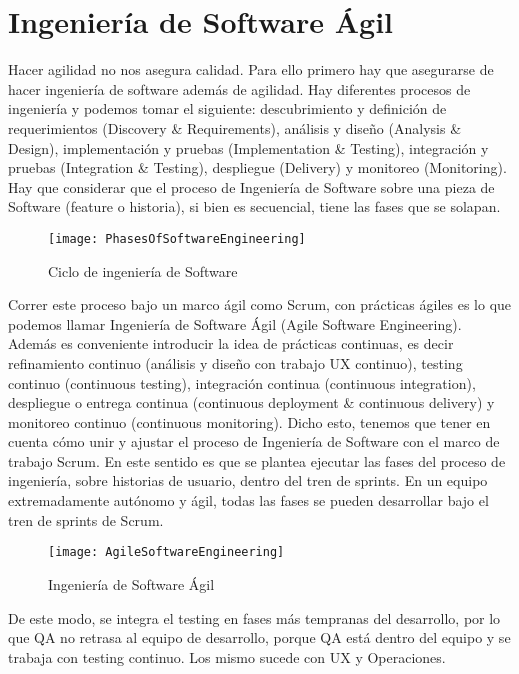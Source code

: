 \chapter{Ingeniería de Software Ágil}

Hacer agilidad no nos asegura calidad. Para ello primero hay que asegurarse de hacer ingeniería de software además de agilidad. Hay diferentes procesos de ingeniería y podemos tomar el siguiente: descubrimiento y definición de requerimientos (Discovery \& Requirements), análisis y diseño (Analysis \& Design), implementación y pruebas (Implementation \& Testing), integración y pruebas (Integration \& Testing), despliegue (Delivery) y monitoreo (Monitoring). Hay que considerar que el proceso de Ingeniería de Software sobre una pieza de Software (feature o historia), si bien es secuencial, tiene las fases que se solapan. 

\begin{figure}[h]
  \centering
  \texttt{[image: PhasesOfSoftwareEngineering]}
  \caption{Ciclo de ingeniería de Software}
  \centering
  \label{fig:PhasesOfSoftwareEngineering} %
\end{figure}

Correr este proceso bajo un marco ágil como Scrum, con prácticas ágiles es lo que podemos llamar Ingeniería de Software Ágil (Agile Software Engineering). Además es conveniente introducir la idea de prácticas continuas, es decir refinamiento continuo (análisis y diseño con trabajo UX continuo), testing continuo (continuous testing), integración continua (continuous integration), despliegue o entrega continua (continuous deployment \& continuous delivery) y monitoreo continuo (continuous monitoring). 
Dicho esto, tenemos que tener en cuenta cómo unir y ajustar el proceso de Ingeniería de Software con el marco de trabajo Scrum. En este sentido es que se plantea ejecutar las fases del proceso de ingeniería, sobre historias de usuario, dentro del tren de sprints. En un equipo extremadamente autónomo y ágil, todas las fases se pueden desarrollar bajo el tren de sprints de Scrum.

\begin{figure}[h]
  \centering
  \texttt{[image: AgileSoftwareEngineering]}
  \caption{Ingeniería de Software Ágil}
  \centering
  \label{fig:AgileSoftwareEngineering} %
\end{figure}

De este modo, se integra el testing en fases más tempranas del desarrollo, por lo que QA no retrasa al equipo de desarrollo, porque QA está dentro del equipo y se trabaja con testing continuo. Los mismo sucede con UX y Operaciones.

